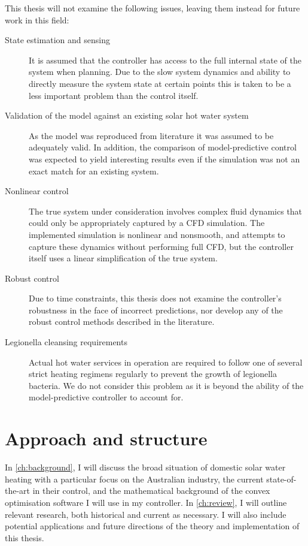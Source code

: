 This thesis will not examine the following issues, leaving them instead for future work in this field:

\begin{description}
	\item[State estimation and sensing]
         It is assumed that the controller has access to the full internal state of the system when planning.
         Due to the slow system dynamics and ability to directly measure the system state at certain points this is taken to be a less important problem than the control itself.
	\item[Validation of the model against an existing solar hot water system]
         As the model was reproduced from literature it was assumed to be adequately valid.
         In addition, the comparison of model-predictive control was expected to yield interesting results even if the simulation was not an exact match for an existing system.
	\item[Nonlinear control]
         The true system under consideration involves complex fluid dynamics that could only be appropriately captured by a CFD simulation.
         The implemented simulation is nonlinear and nonsmooth, and attempts to capture these dynamics without performing full CFD, but the controller itself uses a linear simplification of the true system.
	\item[Robust control]
         Due to time constraints, this thesis does not examine the controller's robustness in the face of incorrect predictions, nor develop any of the robust control methods described in the literature.
	\item[Legionella cleansing requirements]
			Actual hot water services in operation are required to follow one of several strict heating regimens regularly to prevent the growth of legionella bacteria.
			We do not consider this problem as it is beyond the ability of the model-predictive controller to account for.
\end{description}

\section{Approach and structure}


In \autoref{ch:background}, I will discuss the broad situation of domestic solar water heating with a particular focus on the Australian industry, the current state-of-the-art in their control, and the mathematical background of the convex optimisation software I will use in my controller.
In \autoref{ch:review}, I will outline relevant research, both historical and current as necessary.
I will also include potential applications and future directions of the theory and implementation of this thesis.

